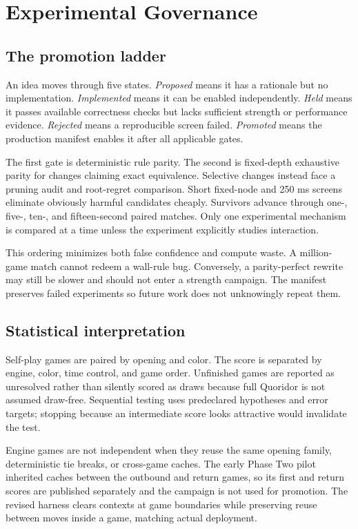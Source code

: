 \section{Experimental Governance}
\subsection{The promotion ladder}
An idea moves through five states. \emph{Proposed} means it has a rationale but no implementation. \emph{Implemented} means it can be enabled independently. \emph{Held} means it passes available correctness checks but lacks sufficient strength or performance evidence. \emph{Rejected} means a reproducible screen failed. \emph{Promoted} means the production manifest enables it after all applicable gates.

The first gate is deterministic rule parity. The second is fixed-depth exhaustive parity for changes claiming exact equivalence. Selective changes instead face a pruning audit and root-regret comparison. Short fixed-node and 250 ms screens eliminate obviously harmful candidates cheaply. Survivors advance through one-, five-, ten-, and fifteen-second paired matches. Only one experimental mechanism is compared at a time unless the experiment explicitly studies interaction.

This ordering minimizes both false confidence and compute waste. A million-game match cannot redeem a wall-rule bug. Conversely, a parity-perfect rewrite may still be slower and should not enter a strength campaign. The manifest preserves failed experiments so future work does not unknowingly repeat them.

\subsection{Statistical interpretation}
Self-play games are paired by opening and color. The score is separated by engine, color, time control, and game order. Unfinished games are reported as unresolved rather than silently scored as draws because full Quoridor is not assumed draw-free. Sequential testing uses predeclared hypotheses and error targets; stopping because an intermediate score looks attractive would invalidate the test.

Engine games are not independent when they reuse the same opening family, deterministic tie breaks, or cross-game caches. The early Phase Two pilot inherited caches between the outbound and return games, so its first and return scores are published separately and the campaign is not used for promotion. The revised harness clears contexts at game boundaries while preserving reuse between moves inside a game, matching actual deployment.

